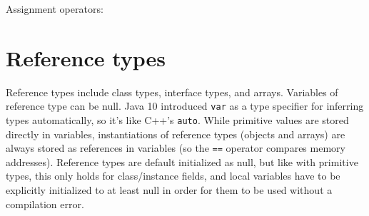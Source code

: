 \documentclass[table, xcdraw]{article}%
\begin{document}
Assignment operators:


\section{Reference types}

Reference types include class types, interface types, and arrays. Variables of reference type can be null. Java 10 introduced \texttt{var} as a type specifier for inferring types automatically, so it's like C++'s \texttt{auto}. While primitive values are stored directly in variables, instantiations of reference types (objects and arrays) are always stored as references in variables (so the \texttt{==} operator compares memory addresses). Reference types are default initialized as null, but like with primitive types, this only holds for class/instance fields, and local variables have to be explicitly initialized to at least null in order for them to be used without a compilation error.
\end{document}
